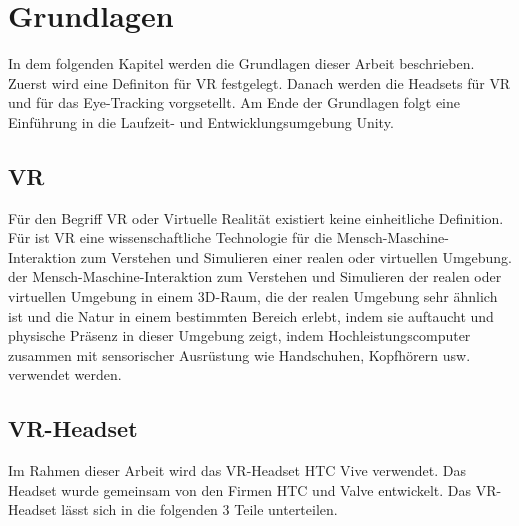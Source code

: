 
\chapter{Grundlagen}
In dem folgenden Kapitel werden die Grundlagen dieser Arbeit beschrieben. Zuerst wird eine Definiton für \acl{VR} festgelegt. Danach werden die Headsets für \acl{VR} und für das Eye-Tracking vorgsetellt. Am Ende der Grundlagen folgt eine Einführung in die Laufzeit- und Entwicklungsumgebung Unity.


\section{\acl{VR}}
Für den Begriff \ac{VR} oder Virtuelle Realität existiert keine einheitliche Definition. Für \citeauthor{8070720} ist \ac{VR} 
eine wissenschaftliche Technologie für die Mensch-Maschine-Interaktion zum Verstehen und Simulieren einer realen oder virtuellen Umgebung. 
der Mensch-Maschine-Interaktion zum Verstehen und Simulieren der realen oder virtuellen Umgebung in einem 3D-Raum, die der realen Umgebung sehr ähnlich ist und die Natur in einem bestimmten Bereich erlebt, indem sie auftaucht und physische Präsenz in dieser Umgebung zeigt, indem Hochleistungscomputer zusammen mit sensorischer Ausrüstung wie Handschuhen, Kopfhörern usw. verwendet werden.\grqq \cite[vgl.]{8070720}



\section{\acs{VR}-Headset}
Im Rahmen dieser Arbeit wird das \acs{VR}-Headset HTC Vive verwendet. Das Headset wurde gemeinsam von den Firmen HTC und Valve entwickelt. Das \acs{VR}-Headset lässt sich in die folgenden 3 Teile unterteilen. 


